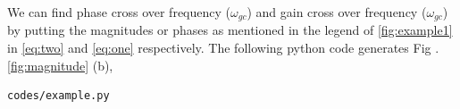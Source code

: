 \begin{enumerate}[label=\thesection.\arabic*.,ref=\thesection.\theenumi]
We can find phase cross over frequency ($\omega_{gc}$) and gain cross over frequency ($\omega_{gc}$) by putting the magnitudes or phases as mentioned in the legend of \ref{fig:example1} in \eqref{eq:two}
and \eqref{eq:one} respectively.
The following python code generates  Fig . \ref{fig:magnitude} (b),
\begin{lstlisting}
codes/example.py
\end{lstlisting}


\end{enumerate}
